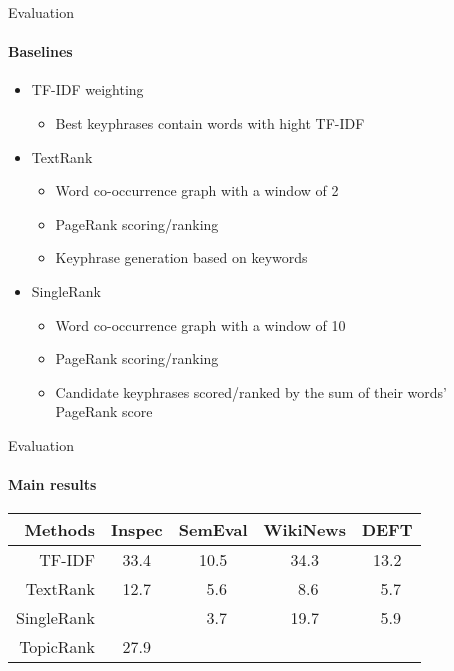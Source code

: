   \begin{frame}{Evaluation}
    \framesubtitle{Baselines}

    \begin{itemize}
      \item<+->{TF-IDF weighting}
      \begin{itemize}
        [triangle]
        \item{Best keyphrases contain words with hight TF-IDF}
      \end{itemize}
      \item<+->{TextRank}
      \begin{itemize}
        [triangle]
        \item{Word co-occurrence graph with a window of 2}
        \item{PageRank scoring/ranking}
        \item{Keyphrase generation based on keywords}
      \end{itemize}
      \item<+->{SingleRank}
      \begin{itemize}
        [triangle]
        \item{Word co-occurrence graph with a window of 10}
        \item{PageRank scoring/ranking}
        \item{Candidate keyphrases scored/ranked by the sum of their words' PageRank score}
      \end{itemize}
    \end{itemize}

  \end{frame}

  \begin{frame}{Evaluation}
    \framesubtitle{Main results}
    
    \begin{center}
      \begin{tabular}{rcccc}
        \toprule
        Methods & Inspec & SemEval & WikiNews & DEFT\\
        \midrule
        TF-IDF & 33.4 & 10.5 & 34.3 & 13.2\\
        TextRank & 12.7 & $~~$5.6 & $~~$8.6 & $~~$5.7\\
        SingleRank & \cellcolor{pink}{35.2} & $~~$3.7 & 19.7 & $~~$5.9\\
        TopicRank & 27.9 & \cellcolor{pink}{12.1} & \cellcolor{pink}{35.6} & \cellcolor{pink}{15.1}\\
        \bottomrule
      \end{tabular}
    \end{center}
  \end{frame}

